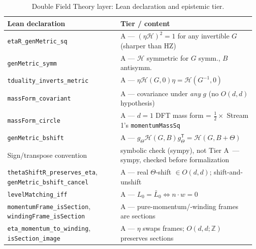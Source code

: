 \documentclass[11pt,a4paper]{article}
\theoremstyle{remark}
\newcommand{\tierS}{\colorbox{gray!15}{\textsf{\scriptsize symbolic check (sympy), not Tier A}}}
\begin{document}
\begin{table}[htbp]
\centering\footnotesize
\caption{Double Field Theory layer: Lean declaration and epistemic tier.}
\label{tab:dft}
\begin{tabular}{@{}l l@{}}
\toprule
\textbf{Lean declaration} & \textbf{Tier / content} \\ \midrule
\texttt{etaR\_genMetric\_sq} & A --- $(\eta\mathcal{H})^2=1$ for any invertible $G$ (sharper than HZ) \\
\texttt{genMetric\_symm} & A --- $\mathcal{H}$ symmetric for $G$ symm., $B$ antisymm. \\
\texttt{tduality\_inverts\_metric} & A --- $\eta\mathcal{H}(G,0)\eta=\mathcal{H}(G^{-1},0)$ \\
\texttt{massForm\_covariant} & A --- covariance under \emph{any} $g$ (no $O(d,d)$ hypothesis) \\
\texttt{massForm\_circle} & A --- $d=1$ DFT mass form = $\tfrac12\times$ Stream 1's \texttt{momentumMassSq} \\
\texttt{genMetric\_bshift} & A --- $g_\Theta\mathcal{H}(G,B)g_\Theta^{\mathsf T}=\mathcal{H}(G,B+\Theta)$ \\
Sign/transpose convention & \tierS\ --- sympy, checked before formalization \\
\texttt{thetaShiftR\_preserves\_eta}, \texttt{genMetric\_bshift\_cancel} & A --- real $\Theta$-shift $\in O(d,d)$; shift-and-unshift \\
\texttt{levelMatching\_iff} & A --- $L_0=\bar L_0 \iff n\cdot w=0$ \\
\texttt{momentumFrame\_isSection}, \texttt{windingFrame\_isSection} & A --- pure-momentum/-winding frames are sections \\
\texttt{eta\_momentum\_to\_winding}, \texttt{isSection\_image} & A --- $\eta$ swaps frames; $O(d,d;\mathbb{Z})$ preserves sections \\
\bottomrule
\end{tabular}
\end{table}

\end{document}
